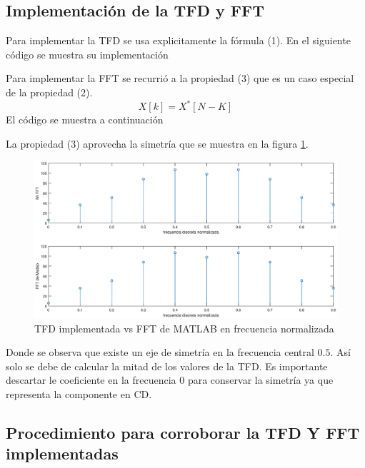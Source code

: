 \documentclass[12pt]{article}
\begin{document}
\subsection{Implementación de la TFD y FFT}
Para implementar la TFD se usa explicitamente la fórmula (1). En el siguiente código se muestra su implementación

Para implementar la FFT se recurrió a la propiedad (3) que es un caso especial de la propiedad (2).
\begin{equation}
    X[k]=X^{*}[N-K]
\end{equation}
El código se muestra a continuación

La propiedad (3) aprovecha la simetría que se muestra en la figura \ref{fig:comparacion}.

\begin{figure}[h!]
 \centering
 \includegraphics[width=1\textwidth]{ima1.eps}
 \caption{TFD implementada vs FFT de MATLAB en frecuencia normalizada}
 \label{fig:comparacion}
\end{figure}

Donde se observa que existe un eje de simetría en la frecuencia central $0.5$. Así solo se debe de calcular la mitad de los valores de la TFD. Es importante descartar le coeficiente en la frecuencia $0$  para conservar la simetría ya que representa la componente en CD.
\subsection{Procedimiento para corroborar la TFD Y FFT implementadas}
\end{document}
